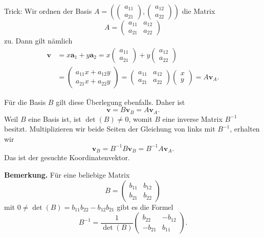 \documentclass[9pt]{beamer}
\newcommand{\bv}[1]{\mathbf{#1}}
\newcommand{\strong}[1]{\textsf{\textbf{#1}}}
\newcommand{\basis}[1]{#1}
\begin{document}
\begin{frame}[t]
\vspace{4em}
Trick: Wir ordnen der Basis
$\basis A=(\begin{pmatrix}a_{11}\\ a_{21}\end{pmatrix},
\begin{pmatrix}a_{12}\\ a_{22}\end{pmatrix})$
die Matrix
\[A=\begin{pmatrix}a_{11} & a_{12}\\ a_{21} & a_{22}\end{pmatrix}\]
zu.\pause{} Dann gilt nämlich
\begin{align*}
\bv v &= x\bv a_1 + y\bv a_2 = x\begin{pmatrix}a_{11}\\ a_{21}\end{pmatrix}
+ y\begin{pmatrix}a_{12}\\ a_{22}\end{pmatrix}\\
&= \begin{pmatrix}a_{11}x + a_{12}y\\ a_{21}x + a_{22}y\end{pmatrix}
= \begin{pmatrix}a_{11} & a_{12}\\ a_{21} & a_{22}\end{pmatrix}\begin{pmatrix}x\\ y\end{pmatrix}
= A\bv v_{\basis A}.
\end{align*}
\end{frame}

\begin{frame}
Für die Basis $\basis B$ gilt diese Überlegung ebenfalls. Daher ist
\[\bv v = B\bv v_{\basis B} = A\bv v_{\basis A}.\]\pause
Weil $\basis B$ eine Basis ist, ist $\det(B)\ne 0$, womit $B$ eine
inverse Matrix $B^{-1}$ besitzt. Multiplizieren wir beide Seiten
der Gleichung von links mit $B^{-1}$, erhalten wir
\[\bv v_{\basis B} = B^{-1}B\bv v_{\basis B} = B^{-1}A\bv v_{\basis A}.\]
Das ist der gesuchte Koordinatenvektor.
\end{frame}

\begin{frame}
\strong{Bemerkung.} Für eine beliebige Matrix
\[B = \begin{pmatrix}b_{11} & b_{12}\\ b_{21} & b_{22}\end{pmatrix}\]
mit $0\ne \det(B) = b_{11}b_{22}-b_{12}b_{21}$ gibt es die Formel
\[B^{-1} = \frac{1}{\det(B)}\begin{pmatrix}
 b_{22} & -b_{12}\\
-b_{21} &  b_{11}
\end{pmatrix}.\]
\end{frame}
\end{document}
